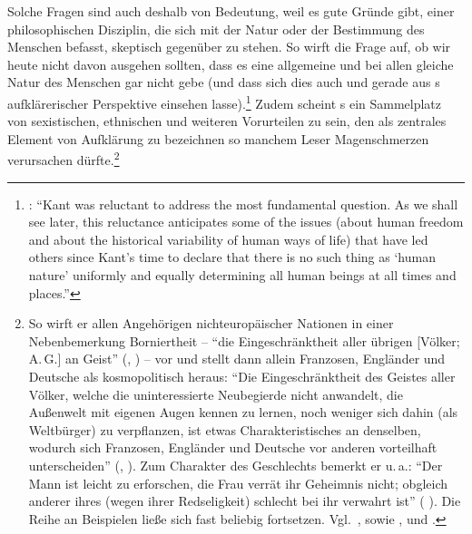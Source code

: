 Solche Fragen sind auch deshalb von Bedeutung, weil es gute Gründe gibt, einer
philosophischen Disziplin, die sich mit der Natur oder der Bestimmung
des Menschen befasst, skeptisch gegenüber zu stehen. So wirft 
die Frage auf, ob wir heute nicht davon ausgehen sollten, dass es eine allgemeine und
bei allen gleiche Natur des Menschen gar nicht gebe (und dass sich dies auch und
gerade aus s aufklärerischer Perspektive einsehen
lasse).\footnote{\cite[Vgl.][38--39]{Wood:KantandtheProblemofHumanNature2003}:
\enquote{Kant was reluctant to address the most fundamental question. As we
shall see later, this reluctance anticipates some of the issues (about human
freedom and about the historical variability of human ways of life) that have
led others since Kant's time to declare that there is no such thing as
\enquote{human nature} uniformly and equally determining all human beings at all
times and places.}} Zudem scheint s  ein Sammelplatz von sexistischen, ethnischen und
weiteren Vorurteilen zu sein, den als zentrales Element von Aufklärung zu
bezeichnen so manchem Leser Magenschmerzen verursachen
dürfte.\footnote{So wirft er allen Angehörigen nichteuropäischer Nationen in
einer Nebenbemerkung Borniertheit -- \enquote{die Eingeschränktheit
aller übrigen [Völker; A.\,G.] an Geist}
\mkbibparens{\cite[][A 300]{Kant:AnthropologieinpragmatischerHinsicht1977},
\cite[][VII: 312.28--29]{Kant:GesammelteWerke1900ff.}} -- vor und stellt dann
allein Franzosen, Engländer und Deutsche als kosmopolitisch heraus:
\enquote{Die Eingeschränktheit des Geistes aller Völker, welche die
uninteressierte Neubegierde nicht anwandelt, die Außenwelt mit eigenen Augen
kennen zu lernen, noch weniger sich dahin (als Weltbürger) zu verpflanzen, ist
etwas Charakteristisches an denselben, wodurch sich Franzosen, Engländer und
Deutsche vor anderen vorteilhaft unterscheiden}
\mkbibparens{\cite[][A 306]{Kant:AnthropologieinpragmatischerHinsicht1977},
\cite[][VII: 316.33--37]{Kant:GesammelteWerke1900ff.}}. Zum Charakter des
Geschlechts bemerkt er u.\,a.: \enquote{Der Mann ist leicht zu erforschen, die
Frau verrät ihr Geheimnis nicht; obgleich anderer ihres (wegen ihrer
Redseligkeit) schlecht bei ihr verwahrt ist}
\mkbibparens{\cite[][A 285\,f.,]{Kant:AnthropologieinpragmatischerHinsicht1977}
\cite[][VII: 303.35--304.2]{Kant:GesammelteWerke1900ff.}}. Die Reihe an
Beispielen ließe sich fast beliebig fortsetzen.
Vgl.~\cite[271]{Boehme:AnthropologieinpragmatischerHinsicht1985}, sowie
\cite[79]{Louden:TheSecondPartofMorals2003}, und
\cite[173]{Schmidt:KantsTranscendentalEmpiricalPragmaticandMoralAnthropology2007}.}
